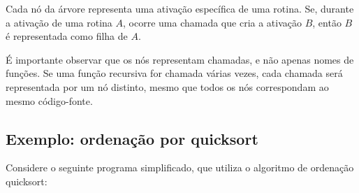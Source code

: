 \documentclass[
  brazilian,
  letterpaper,
]{book}
\theoremstyle{plain}
\theoremstyle{definition}
\theoremstyle{remark}
\begin{document}
Cada nó da árvore representa uma ativação específica de uma rotina. Se,
durante a ativação de uma rotina \(A\), ocorre uma chamada que cria a
ativação \(B\), então \(B\) é representada como filha de \(A\).

É importante observar que os nós representam chamadas, e não apenas
nomes de funções. Se uma função recursiva for chamada várias vezes, cada
chamada será representada por um nó distinto, mesmo que todos os nós
correspondam ao mesmo código-fonte.

\subsection{Exemplo: ordenação por
quicksort}\label{exemplo-ordenauxe7uxe3o-por-quicksort}

Considere o seguinte programa simplificado, que utiliza o algoritmo de
ordenação quicksort:
\end{document}
